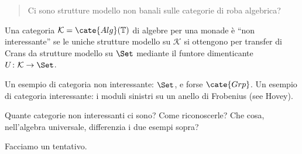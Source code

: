 \documentclass[12pt]{amsart}
\def\Alg{\cate{Alg}}
\def\Grp{\cate{Grp}}
\def\T{\mathbb{T}}
\def\K{\mathcal K}
\begin{document}
\begin{abstract}
Ci sono strutture modello non banali sulle categorie di roba algebrica?
\end{abstract}
\begin{definition}
Una categoria $\K = \Alg(\T)$ di algebre per una monade è ``non interessante'' se le uniche strutture modello su $\K$ si ottengono per transfer di Crans da strutture modello su $\Set$ mediante il funtore dimenticante $U \colon \K \to \Set$.
\end{definition}
\begin{example}
Un esempio di categoria non interessante: $\Set$, e forse $\Grp$. Un esempio di categoria interessante: i moduli sinistri su un anello di Frobenius (see Hovey).
\end{example}
\begin{quest}
Quante categorie non interessanti ci sono? Come riconoscerle? Che cosa, nell'algebra universale, differenzia i due esempi sopra?
\end{quest}
Facciamo un tentativo.
\end{document}
